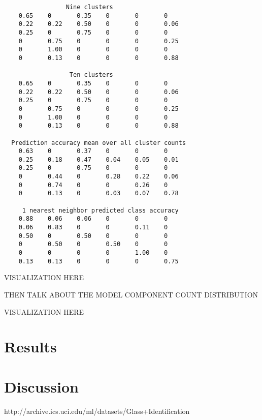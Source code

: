 \documentclass[a4paper]{article}
\begin{document}
\begin{verbatim}
                 Nine clusters
    0.65    0       0.35    0       0       0   
    0.22    0.22    0.50    0       0       0.06
    0.25    0       0.75    0       0       0   
    0       0.75    0       0       0       0.25
    0       1.00    0       0       0       0   
    0       0.13    0       0       0       0.88

                  Ten clusters
    0.65    0       0.35    0       0       0   
    0.22    0.22    0.50    0       0       0.06
    0.25    0       0.75    0       0       0   
    0       0.75    0       0       0       0.25
    0       1.00    0       0       0       0   
    0       0.13    0       0       0       0.88

  Prediction accuracy mean over all cluster counts
    0.63    0       0.37    0       0       0   
    0.25    0.18    0.47    0.04    0.05    0.01
    0.25    0       0.75    0       0       0   
    0       0.44    0       0.28    0.22    0.06
    0       0.74    0       0       0.26    0   
    0       0.13    0       0.03    0.07    0.78

     1 nearest neighbor predicted class accuracy
    0.88    0.06    0.06    0       0       0   
    0.06    0.83    0       0       0.11    0   
    0.50    0       0.50    0       0       0   
    0       0.50    0       0.50    0       0   
    0       0       0       0       1.00    0   
    0.13    0.13    0       0       0       0.75
\end{verbatim}

\par
VISUALIZATION HERE

\par
THEN TALK ABOUT THE MODEL COMPONENT COUNT DISTRIBUTION

\par
VISUALIZATION HERE

\section{Results}

\section{Discussion}

\par
[1] http://archive.ics.uci.edu/ml/datasets/Glass+Identification

\end{document}
